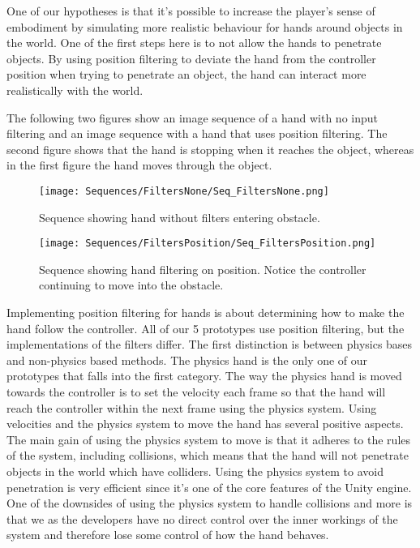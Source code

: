 One of our hypotheses is that it's possible to increase the player's sense of embodiment by simulating more realistic behaviour for hands around objects in the world. One of the first steps here is to not allow the hands to penetrate objects. By using position filtering to deviate the hand from the controller position when trying to penetrate an object, the hand can interact more realistically with the world.

The following two figures show an image sequence of a hand with no input filtering and an image sequence with a hand that uses position filtering. The second figure shows that the hand is stopping when it reaches the object, whereas in the first figure the hand moves through the object.

\begin{figure}[H]
\centering
\texttt{[image: Sequences/FiltersNone/Seq\_FiltersNone.png]}
\caption{Sequence showing hand without filters entering obstacle.}
\label{fig:filtersNone}
\end{figure}

\begin{figure}[H]
\centering
\texttt{[image: Sequences/FiltersPosition/Seq\_FiltersPosition.png]}
\caption{Sequence showing hand filtering on position. Notice the controller continuing to move into the obstacle.}
\label{fig:filtersPosition}
\end{figure}

Implementing position filtering for hands is about determining how to make the hand follow the controller. All of our 5 prototypes use position filtering, but the implementations of the filters differ. The first distinction is between physics bases and non-physics based methods. The physics hand is the only one of our prototypes that falls into the first category. The way the physics hand is moved towards the controller is to set the velocity each frame so that the hand will reach the controller within the next frame using the physics system. Using velocities and the physics system to move the hand has several positive aspects. The main gain of using the physics system to move is that it adheres to the rules of the system, including collisions, which means that the hand will not penetrate objects in the world which have colliders. Using the physics system to avoid penetration is very efficient since it's one of the core features of the Unity engine. One of the downsides of using the physics system to handle collisions and more is that we as the developers have no direct control over the inner workings of the system and therefore lose some control of how the hand behaves.

